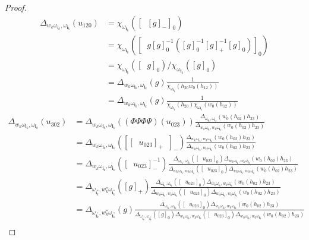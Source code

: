 \documentclass{amsart}
\theoremstyle{plain}
\theoremstyle{definition}
\theoremstyle{remark}
\newcommand{\fundamentalweight}{\omega}
\newcommand{\genminoryz}[3]{\Delta_{{#1} \fundamentalweight_{#3}, {#2}%
    \fundamentalweight_{#3}}}
\newcommand{\lifttoG}[1]{{\mathop{\overline{#1}}}}
\newcommand{\dlifttoG}[1]{{\mathop{\overline{\overline{#1}}}}}
\newcommand{\word}[1]{\mathbf{#1}}
\begin{document}
\begin{proof}
    \begin{align*}
      \genminoryz{w_k}{}{\word{i}_k}(u_{120}) &= \chi_{\fundamentalweight_{\word{i}_k}}\left(\left[ \dlifttoG{w_k^{-1}} [g]_{-} \right]_{0}\right) \\
      &= \chi_{\fundamentalweight_{\word{i}_k}}\left(\left[ \dlifttoG{w_k^{-1}} g [g]_{0}^{-1} \left( [g]_{0}^{-1} [g]_{+}^{-1} [g]_{0} \right) \right]_{0}\right) \\
      &= \chi_{\fundamentalweight_{\word{i}_k}}\left(\left[ \dlifttoG{w_k^{-1}} g \right]_{0} \right) / \chi_{\fundamentalweight_{\word{i}_k}} \left( [g]_{0} \right) \\
      &= \genminoryz{w_k}{}{\word{i}_k}(g) \frac{1}{\chi_{\fundamentalweight_{\word{i}_k}}(h_{20} w_0(h_{12}))} \\
      &= \genminoryz{w_k}{}{\word{i}_k}(g) \frac{1}{\chi_{\fundamentalweight_{\word{i}_k}}(h_{20}) \chi_{\fundamentalweight_{\word{i}_k}}(w_0(h_{12}))}
    \end{align*}
    \begin{align*}
      \genminoryz{w_k}{}{\word{i}_k}(u_{302}) &= \genminoryz{w_k}{}{\word{i}_k}( (\Phi \Psi \Phi \Psi)(u_{023}) ) \frac{\genminoryz{}{}{\word{i}_k}(w_0(h_{02}) h_{23})}{\genminoryz{w_k}{w_k}{\word{i}_k}(w_0(h_{02}) h_{23})} \\
      &= \genminoryz{w_k}{}{\word{i}_k}( [[\lifttoG{w_0} u_{023}]_{+} \lifttoG{w_0}]_{-}) \frac{\genminoryz{w_k}{w_k}{\word{i}_k}(w_0(h_{02}) h_{23})}{\genminoryz{w_0}{w_0}{\word{i}_k}(w_0(h_{02}) h_{23})} \\
      &= \genminoryz{w_k}{}{\word{i}_k}([\lifttoG{w_0} u_{023}]_{-}^{-1}) \frac{\genminoryz{}{}{\word{i}_k}([\lifttoG{w_0} u_{023}]_{0}) \genminoryz{w_k}{w_k}{\word{i}_k}(w_0(h_{02}) h_{23})}{\genminoryz{w_k}{w_k}{\word{i}_k}([\lifttoG{w_0} u_{023}]_{0}) \genminoryz{w_0}{w_0}{\word{i}_k}(w_0(h_{02}) h_{23})} \\
      &= \genminoryz{}{w_k^{\ast}}{\word{i}_k^{\ast}}([g]_{+}) \frac{\genminoryz{}{}{\word{i}_k}([\lifttoG{w_0} u_{023}]_{0}) \genminoryz{w_k}{w_k}{\word{i}_k}(w_0(h_{02}) h_{23})}{\genminoryz{w_k}{w_k}{\word{i}_k}([\lifttoG{w_0} u_{023}]_{0}) \genminoryz{w_0}{w_0}{\word{i}_k}(w_0(h_{02}) h_{23})} \\
      &= \genminoryz{}{w_k^{\ast}}{\word{i}_k^{\ast}}(g) \frac{\genminoryz{}{}{\word{i}_k}([\lifttoG{w_0} u_{023}]_{0}) \genminoryz{w_k}{w_k}{\word{i}_k}(w_0(h_{02}) h_{23})}{ \genminoryz{}{}{\word{i}_{k}^{\ast}}([g]_{0}) \genminoryz{w_k}{w_k}{\word{i}_k}([\lifttoG{w_0} u_{023}]_{0}) \genminoryz{w_0}{w_0}{\word{i}_k}(w_0(h_{02}) h_{23})} \\

\end{align*}
\end{proof}
\end{document}
